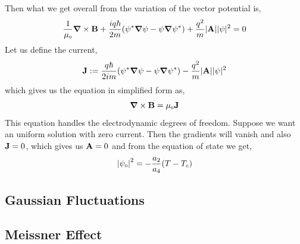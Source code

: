 Then what we get overall from the variation of the vector potential is, 
\begin{equation}
   \frac{1}{\mu_{\text{\tiny 0}}} \grad\times \vb{B} + \frac{iq\hbar}{2m}\qty(\psi^* \grad\psi -\psi \grad \psi^*) + \frac{q^2}{m}|\vb{A}| |\psi|^2=0
\end{equation}
Let us define the current, $$\vb{J} := \frac{q\hbar}{2im}\qty(\psi^* \grad\psi -\psi \grad \psi^*) - \frac{q^2}{m}|\vb{A}| |\psi|^2$$
which gives us the equation in simplified form as, $$\grad\times \vb{B}  = \mu_{\text{\tiny 0}}\vb{J}$$
This equation handles the electrodynamic degrees of freedom. Suppose we want an uniform solution with zero current. Then the gradients will vanish and also $\vb{J} =0$, which gives us $\vb{A}=0$ and from the equation of state we get, 
$$\abs{\psi_{\text{\tiny 0}}}^2 = -\frac{a_2}{a_4}(T-T_c)$$
\subsection{Gaussian Fluctuations}
\subsection{Meissner Effect}